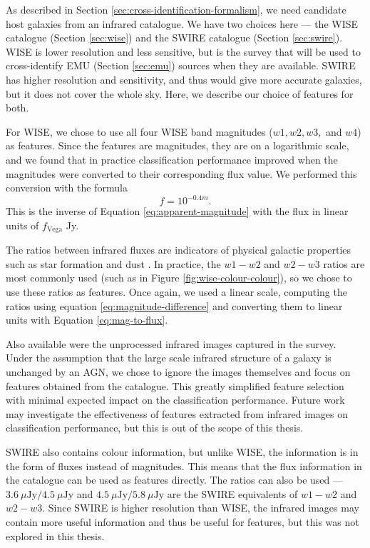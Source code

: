     As described in Section \ref{sec:cross-identification-formalism}, we need
    candidate host galaxies from an infrared catalogue. We have two choices here
    --- the WISE catalogue (Section \ref{sec:wise}) and the SWIRE catalogue
    (Section \ref{sec:swire}). WISE is lower resolution and less sensitive, but
    is the survey that will be used to cross-identify EMU (Section
    \ref{sec:emu}) sources when they are available. SWIRE has higher
    resolution and sensitivity, and thus would give more accurate galaxies, but
    it does not cover the whole sky. Here, we describe our choice of features
    for both.

    For WISE, we chose to use all four WISE band magnitudes ($w1, w2, w3,$ and
    $w4$) as features. Since the features are magnitudes, they are on a
    logarithmic scale, and we found that in practice classification performance
    improved when the magnitudes were converted to their corresponding flux
    value. We performed this conversion with the formula
    \begin{equation}
      \label{eq:mag-to-flux}
      f = 10^{-0.4m}.
    \end{equation}
    This is the inverse of Equation \ref{eq:apparent-magnitude} with the flux in
    linear units of $f_{\text{Vega}}$ Jy.

    The ratios between infrared fluxes are indicators of physical galactic
    properties such as star formation and dust . In practice, the $w1 - w2$ and $w2 - w3$
    ratios are most commonly used (such as in Figure
    \ref{fig:wise-colour-colour}), so we chose to use these ratios as features.
    Once again, we used a linear scale, computing the ratios using equation
    \ref{eq:magnitude-difference} and converting them to linear units with
    Equation \ref{eq:mag-to-flux}.

    Also available were the unprocessed infrared images captured in the survey.
    Under the assumption that the large scale infrared structure of a galaxy is
    unchanged by an AGN, we chose to ignore the images themselves and focus on
    features obtained from the catalogue. This greatly simplified feature
    selection with minimal expected impact on the classification performance.
    Future work may investigate the effectiveness of features extracted from
    infrared images on classification performance, but this is out of the scope
    of this thesis.

    SWIRE also contains colour information, but unlike WISE, the information is
    in the form of fluxes instead of magnitudes. This means that the flux
    information in the catalogue can be used as features directly. The ratios
    can also be used --- $3.6\ \mu\text{Jy} / 4.5\ \mu\text{Jy}$ and $4.5\
    \mu\text{Jy} / 5.8\ \mu\text{Jy}$ are the SWIRE equivalents of $w1 - w2$ and
    $w2 - w3$. Since SWIRE is higher resolution than WISE, the
    infrared images may contain more useful information and thus be useful for
    features, but this was not explored in this thesis.

